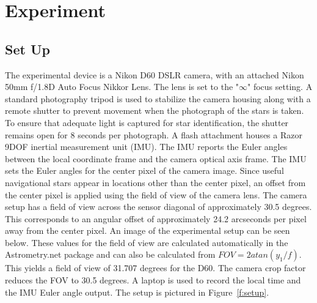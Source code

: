 \documentclass[]{aiaa-tc}%
\begin{document}
\section{Experiment}
\subsection*{Set Up}
The experimental device is a Nikon D60 DSLR camera, with an attached Nikon 50mm f/1.8D Auto Focus Nikkor Lens.  The lens is set to the "$\infty$" focus setting.  A standard photography tripod is used to stabilize the camera housing along with a remote shutter to prevent movement when the photograph of the stars is taken.  To ensure that adequate light is captured for star identification, the shutter remains open for 8 seconds per photograph. 
A flash attachment houses a Razor 9DOF inertial measurement unit (IMU).  The IMU reports the Euler angles between the local coordinate frame and the camera optical axis frame.  The IMU sets the Euler angles for the center pixel of the camera image.  Since useful navigational stars appear in locations other than the center pixel, an offset from the center pixel is applied using the field of view of the camera lens.  The camera setup has a field of view across the sensor diagonal of approximately 30.5 degrees.  This corresponds to an angular offset of approximately 24.2 arcseconds per pixel away from the center pixel.  An image of the experimental setup can be seen below.  These values for the field of view are calculated automatically in the Astrometry.net package and can also be calculated from $FOV = 2 atan(y_{1}/f)$\cite{b:aov}.  This yields a field of view of 31.707 degrees for the D60.  The camera crop factor reduces the FOV to 30.5 degrees. A laptop is used to record the local time and the IMU Euler angle output. The setup is pictured in Figure~\ref{f:setup}.
\end{document}
